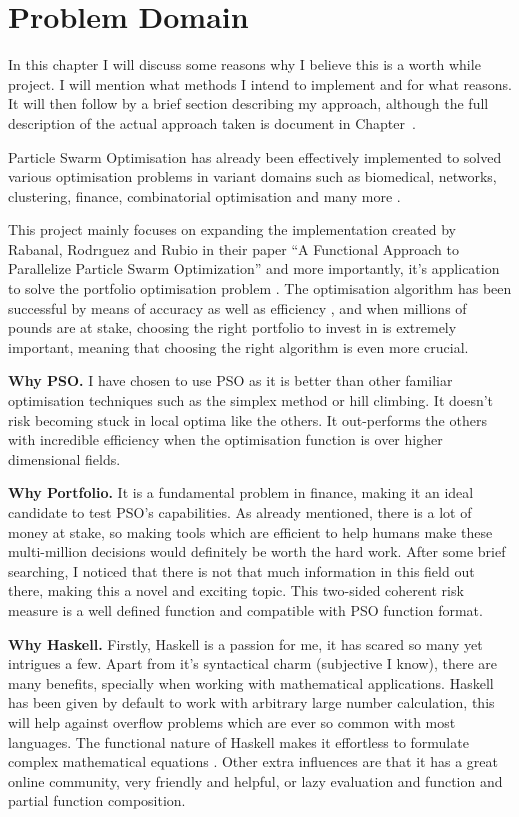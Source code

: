\documentclass{pdfmx4020}
\begin{document}

\chapter{Problem Domain}

  In this chapter I will discuss some reasons why I believe this is a worth while project. I will mention what methods I intend to implement and for what reasons. It will then follow by a brief section describing my approach, although the full description of the actual approach taken is document in Chapter~.
  
  Particle Swarm Optimisation has already been effectively implemented to solved various optimisation problems \cite{pso_app,pso_app2,pso_app3} in variant domains such as biomedical, networks, clustering, finance, combinatorial optimisation and many more \cite{pso_app_main}. 

  This project mainly focuses on expanding the implementation created by Rabanal, Rodrıguez and Rubio in their paper ``A Functional Approach to Parallelize Particle Swarm Optimization'' and more importantly, it's application to solve the portfolio optimisation problem \cite{marko2}. The optimisation algorithm has been successful by means of accuracy as well as efficiency \cite{haskellPSO}, and when millions of pounds are at stake, choosing the right portfolio to invest in is extremely important, meaning that choosing the right algorithm is even more crucial.

  \textbf{Why PSO.} I have chosen to use PSO as it is better than other familiar optimisation techniques such as the simplex method or hill climbing. It doesn't risk becoming stuck in local optima like the others. It out-performs the others with incredible efficiency when the optimisation function is over higher dimensional fields. 

  \textbf{Why Portfolio.} It is a fundamental problem in finance, making it an ideal candidate to test PSO's capabilities. As already mentioned, there is a lot of money at stake, so making tools which are efficient to help humans make these multi-million decisions would definitely be worth the hard work. After some brief searching, I noticed that there is not that much information in this field out there, making this a novel and exciting topic. This two-sided coherent risk measure is a well defined function and compatible with PSO function format. 

  \textbf{Why Haskell.} Firstly, Haskell is a passion for me, it has scared so many yet intrigues a few. Apart from it's syntactical charm (subjective I know), there are many benefits, specially when working with mathematical applications. Haskell has been given by default to work with arbitrary large number calculation, this will help against overflow problems which are ever so common with most languages. The functional nature of Haskell makes it effortless to formulate complex mathematical equations \cite{haskellPSO}. Other extra influences are that it has a great online community, very friendly and helpful, or lazy evaluation and function and partial function composition. 
\end{document}
